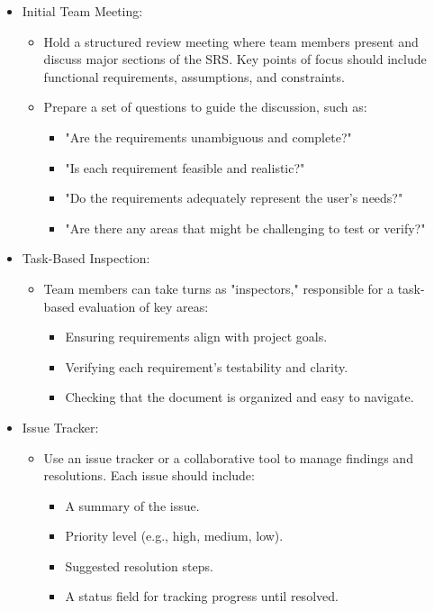 \documentclass[12pt, titlepage]{article}
\begin{document}
\begin{itemize}
	\item Initial Team Meeting:\
	\begin{itemize}
		\item Hold a structured review meeting where team members present and discuss major sections of the SRS. Key points of focus should include functional requirements, assumptions, and constraints.
		\item Prepare a set of questions to guide the discussion, such as:
		\begin{itemize}
			\item "Are the requirements unambiguous and complete?"
			\item "Is each requirement feasible and realistic?"
			\item "Do the requirements adequately represent the user's needs?"
			\item "Are there any areas that might be challenging to test or verify?"
		\end{itemize}
	\end{itemize}
	\item Task-Based Inspection:
	\begin{itemize}
		\item Team members can take turns as "inspectors," responsible for a task-based evaluation of key areas:
		\begin{itemize}
			\item Ensuring requirements align with project goals.
			\item Verifying each requirement's testability and clarity.
			\item Checking that the document is organized and easy to navigate.
		\end{itemize}
	\end{itemize}
	\item Issue Tracker:
	\begin{itemize}
		\item Use an issue tracker or a collaborative tool to manage findings and resolutions. Each issue should include:
		\begin{itemize}
			\item A summary of the issue.
			\item Priority level (e.g., high, medium, low).
			\item Suggested resolution steps.
			\item A status field for tracking progress until resolved.
		\end{itemize}
	\end{itemize}
\end{itemize}
\end{document}
